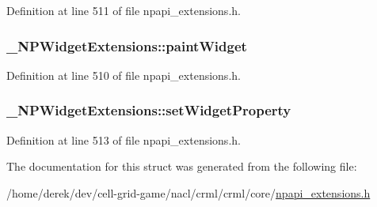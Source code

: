 Definition at line 511 of file npapi\_\-extensions.h.

\hypertarget{struct___n_p_widget_extensions_aceadbaa0477e07b76bd8d94f32c1547a}{
\subsubsection[{paintWidget}]{ {\bf \_\-NPWidgetExtensions::paintWidget}}}
\label{struct___n_p_widget_extensions_aceadbaa0477e07b76bd8d94f32c1547a}


Definition at line 510 of file npapi\_\-extensions.h.

\hypertarget{struct___n_p_widget_extensions_a7645f4bcbe3ec7d3c1286487d9a2eb65}{
\subsubsection[{setWidgetProperty}]{ {\bf \_\-NPWidgetExtensions::setWidgetProperty}}}
\label{struct___n_p_widget_extensions_a7645f4bcbe3ec7d3c1286487d9a2eb65}


Definition at line 513 of file npapi\_\-extensions.h.



The documentation for this struct was generated from the following file:\begin{DoxyCompactItemize}
\item 
/home/derek/dev/cell-\/grid-\/game/nacl/crml/crml/core/\hyperlink{npapi__extensions_8h}{npapi\_\-extensions.h}\end{DoxyCompactItemize}
